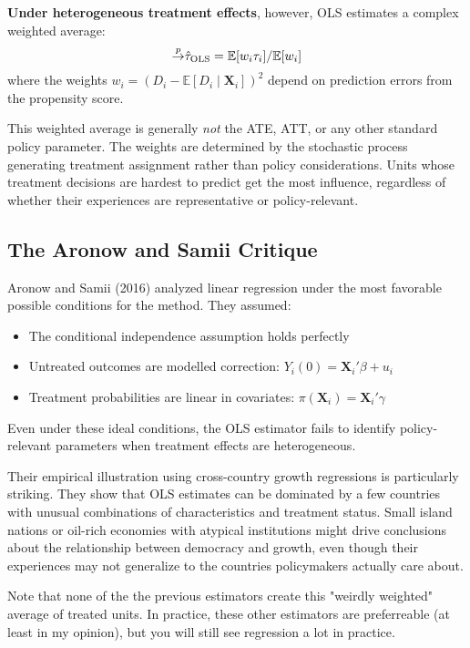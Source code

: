 \documentclass[12pt]{article}
\begin{document}
\begin{multicols}{2}
\textbf{Under heterogeneous treatment effects}, however, OLS estimates a complex weighted average:
$$\mathbin{\overset{p}{\to}} \hat{\tau}_{\text{OLS}} = \mathbb{E}[w_i \tau_i] / \mathbb{E}[w_i]$$
where the weights $w_i = (D_i - \mathbb{E}[D_i \mid \bm{X}_i])^2$ depend on prediction errors from the propensity score.

This weighted average is generally \emph{not} the ATE, ATT, or any other standard policy parameter.
The weights are determined by the stochastic process generating treatment assignment rather than policy considerations.
Units whose treatment decisions are hardest to predict get the most influence, regardless of whether their experiences are representative or policy-relevant.

\subsection*{The Aronow and Samii Critique}

Aronow and Samii (2016) analyzed linear regression under the most favorable possible conditions for the method.
They assumed:
\begin{itemize}
  \item The conditional independence assumption holds perfectly
  \item Untreated outcomes are modelled correction: $Y_i(0) = \bm{X}_i'\beta + u_i$  
  \item Treatment probabilities are linear in covariates: $\pi(\bm{X}_i) = \bm{X}_i'\gamma$
\end{itemize}

Even under these ideal conditions, the OLS estimator fails to identify policy-relevant parameters when treatment effects are heterogeneous.

Their empirical illustration using cross-country growth regressions is particularly striking.
They show that OLS estimates can be dominated by a few countries with unusual combinations of characteristics and treatment status.
Small island nations or oil-rich economies with atypical institutions might drive conclusions about the relationship between democracy and growth, even though their experiences may not generalize to the countries policymakers actually care about.

Note that none of the the previous estimators create this "weirdly weighted" average of treated units. 
In practice, these other estimators are preferreable (at least in my opinion), but you will still see regression a lot in practice.


\end{multicols}
\end{document}
